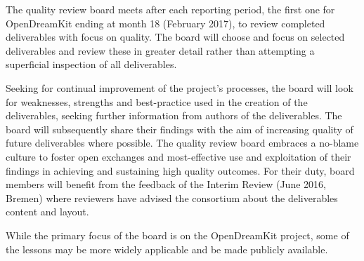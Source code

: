 \documentclass{deliverablereport}
\begin{document}
  The quality review board meets after each reporting period, the first
 one for OpenDreamKit ending at month 18 (February 2017), to review
 completed deliverables with focus on quality. The board will choose
 and focus on selected deliverables and review these in greater detail
 rather than attempting a superficial inspection of all deliverables.

 Seeking for continual improvement of the project's processes, the
 board will look for weaknesses, strengths and best-practice used in
 the creation of the deliverables, seeking further information from
 authors of the deliverables. The board will subsequently share their
 findings with the aim of increasing quality of future deliverables
 where possible. The quality review board embraces a no-blame culture
 to foster open exchanges and most-effective use and exploitation of
 their findings in achieving and sustaining high quality outcomes. For their duty,
 board members will benefit from the feedback of the Interim Review (June 2016, Bremen)
where reviewers have advised the \ODK consortium about the deliverables
 content and layout.

 While the primary focus of the board is on the OpenDreamKit project,
 some of the lessons may be more widely applicable and be made
 publicly available.






\end{document}
